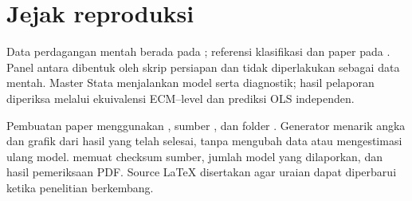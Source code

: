 \section{Jejak reproduksi}
Data perdagangan mentah berada pada ; referensi klasifikasi dan paper pada . Panel antara dibentuk oleh skrip persiapan dan tidak diperlakukan sebagai data mentah. Master Stata menjalankan model serta diagnostik; hasil pelaporan diperiksa melalui ekuivalensi ECM--level dan prediksi OLS independen.

Pembuatan paper menggunakan , sumber , dan folder . Generator menarik angka dan grafik dari hasil yang telah selesai, tanpa mengubah data atau mengestimasi ulang model.  memuat checksum sumber, jumlah model yang dilaporkan, dan hasil pemeriksaan PDF. Source LaTeX disertakan agar uraian dapat diperbarui ketika penelitian berkembang.
